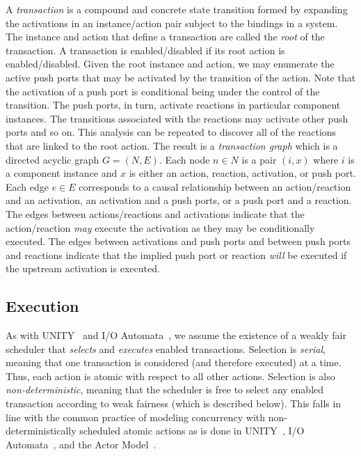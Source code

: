 A \emph{transaction} is a compound and concrete state transition formed by expanding the activations in an instance/action pair subject to the bindings in a system.
The instance and action that define a transaction are called the \emph{root} of the transaction.
A transaction is enabled/disabled if its root action is enabled/disabled.
Given the root instance and action, we may enumerate the active push ports that may be activated by the transition of the action.
Note that the activation of a push port is conditional being under the control of the transition.
The push ports, in turn, activate reactions in particular component instances.
The transitions associated with the reactions may activate other push ports and so on.
This analysis can be repeated to discover all of the reactions that are linked to the root action.
The result is a \emph{transaction graph} which is a directed acyclic graph $G = (N,E)$.
Each node $n \in N$ is a pair $(i, x)$ where $i$ is a component instance and $x$ is either an action, reaction, activation, or push port.
Each edge $e \in E$ corresponds to a causal relationship between an action/reaction and an activation, an activation and a push ports, or a push port and a reaction.
The edges between actions/reactions and activations indicate that the action/reaction \emph{may} execute the activation as they may be conditionally executed.
The edges between activations and push ports and between push ports and reactions indicate that the implied push port or reaction \emph{will} be executed if the upstream activation is executed.

\subsection{Execution}
\label{execution}
As with UNITY~\cite{chandy1989parallel} and I/O Automata~\cite{nancy1996distributed}, we assume the existence of a weakly fair scheduler that \emph{selects} and \emph{executes} enabled transactions.
Selection is \emph{serial}, meaning that one transaction is considered (and therefore executed) at a time.
Thus, each action is atomic with respect to all other actions.
Selection is also \emph{non-deterministic}, meaning that the scheduler is free to select any enabled transaction according to weak fairness (which is described below).
This falls in line with the common practice of modeling concurrency with non-deterministically scheduled atomic actions as is done in UNITY~\cite{chandy1989parallel}, I/O Automata~\cite{nancy1996distributed}, and the Actor Model~\cite{agha1985actors}.

